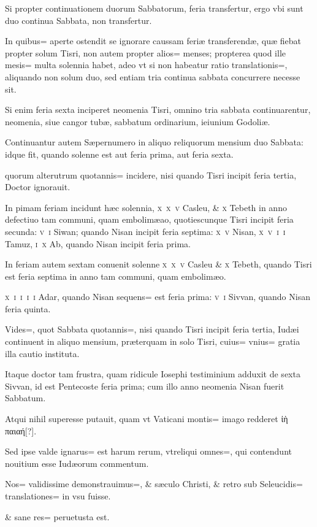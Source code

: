 \begin{parnumbers}
Si propter continuationem duorum Sabbatorum, feria transfertur, ergo vbi sunt duo continua Sabbata, non transfertur. 

In quibus= aperte ostendit se ignorare caussam feriæ transferendæ, quæ fiebat propter solum Tisri, non autem propter alios= menses; propterea quod ille mesis= multa solennia habet, adeo vt si non habeatur ratio translationis=, aliquando non solum duo, sed entiam tria continua sabbata concurrere necesse sit.

Si enim feria sexta inciperet neomenia Tisri, omnino tria sabbata continuarentur, neomenia,
siue cangor tubæ, sabbatum ordinarium, ieiunium Godoliæ.

Continuantur autem Sæpernumero in aliquo reliquorum mensium duo Sabbata: idque fit, quando solenne est aut feria prima, aut feria sexta.

quorum alterutrum quotannis= incidere, nisi quando Tisri incipit feria tertia, Doctor ignorauit.

In pimam feriam incidunt hæc solennia, \textsc{x~x~v} Casleu, \& \textsc{x} Tebeth in anno defectiuo tam communi, quam embolimæao, quotiescunque Tisri incipit feria secunda: \textsc{v~i} Siwan; quando Nisan incipit feria septima: \textsc{x~v} Nisan, \textsc{x~v~i~i} Tamuz, \textsc{i~x} Ab, quando Nisan incipit feria prima.

In feriam autem sextam conuenit solenne \textsc{x~x~v} Casleu \& \textsc{x} Tebeth, quando Tisri est feria septima in anno tam communi, quam embolimæo.

\textsc{x~i~i~i~i} Adar, quando Nisan sequens= est feria prima: \textsc{v~i} Sivvan, quando Nisan feria quinta.

Vides=, quot Sabbata quotannis=, nisi quando Tisri incipit feria tertia, Iudæi continuent in aliquo mensium, præterquam in solo Tisri, cuius= vnius= gratia illa cautio instituta.

Itaque doctor tam frustra, quam ridicule Iosephi testiminium adduxit de sexta Sivvan, id est Pentecoste feria prima; cum illo anno neomenia Nisan fuerit Sabbatum.

Atqui nihil superesse putauit, quam vt Vaticani montis= imago redderet ἰὴ παιαή[?].

Sed ipse valde ignarus= est harum rerum, vtreliqui omnes=, qui contendunt nouitium esse Iudæorum commentum.

Nos= validissime demonstrauimus=, \& sæculo Christi, \& retro sub Seleucidis= translationes= in vsu fuisse.

\& sane res= peruetusta est.


\end{parnumbers}
